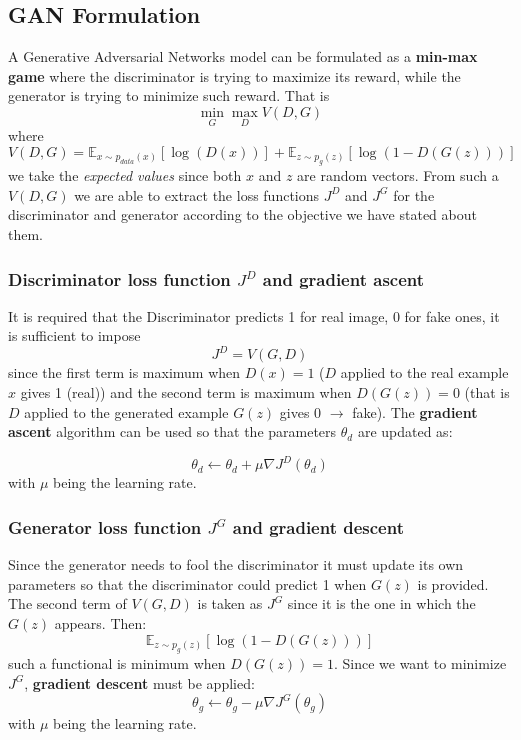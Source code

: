 \subsection{GAN Formulation}
A Generative Adversarial Networks model can be formulated as a \textbf{min-max game} where the discriminator is trying to maximize its reward, while the generator is trying to minimize such reward. That is
\begin{equation}
    \min_{G} \max_{D} V(D,G)
\end{equation}
where
\begin{equation}
    V(D,G)=\mathbb{E}_{x\sim{p_{data}(x)}}[\log(D(x))]+
    \mathbb{E}_{z\sim{p_{g}(z)}}[\log(1-D(G(z)))]
\end{equation}
we take the \textit{expected values} since both $x$ and $z$ are random vectors. From such a $V(D,G)$ we are able to extract the loss functions $J^D$ and $J^G$ for the discriminator and generator according to the objective we have stated about them.

\subsubsection{Discriminator loss function $J^D$ and gradient ascent}
It is required that the Discriminator predicts 1 for real image, 0 for fake ones, it is sufficient to impose
\begin{equation}
    J^D = V(G,D)
\end{equation}
since the first term is maximum when $D(x)=1$ ($D$ applied to the real example $x$ gives 1 (real)) and the second term is maximum when $D(G(z))=0$ (that is $D$ applied to the generated example $G(z)$ gives 0 $\to$ fake). The \textbf{gradient ascent} algorithm can be used so that the parameters $\theta_d$ are updated as:

\begin{equation}
    \theta_d \leftarrow \theta_d + \mu \nabla{J^D}(\theta_d)
\end{equation}
with $\mu$ being the learning rate.

\subsubsection{Generator loss function $J^G$  and gradient descent}
Since the generator needs to fool the discriminator it must update its own parameters so that the discriminator could predict 1 when $G(z)$ is provided. The second term of $V(G,D)$ is taken as $J^G$ since it is the one in which the $G(z)$ appears. Then: 
\begin{equation}
    \mathbb{E}_{z\sim{p_{g}(z)}}[\log(1-D(G(z)))]
\end{equation}
such a functional is minimum when $D(G(z))=1$. Since we want to minimize $J^G$, \textbf{gradient descent} must be applied: 
\begin{equation}
    \theta_g \gets \theta_g  - \mu \nabla{J^G}(\theta_g)
\end{equation}
with $\mu$ being the learning rate.\\

